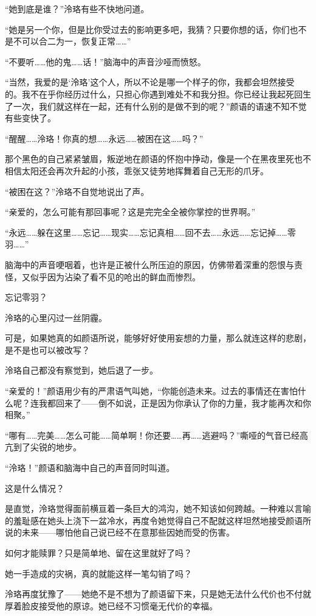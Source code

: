 \documentclass[UTF8, scheme = chinese, openany]{ctexbook}
\begin{document}
“她到底是谁？”泠珞有些不快地问道。

“她是另一个你，但是比你受过去的影响更多吧，我猜？只要你想的话，你们也不是不可以合二为一，恢复正常……”

“不要听……他的鬼……话！”脑海中的声音沙哑而愤怒。

“当然，我爱的是‘泠珞’这个人，所以不论是哪一个样子的你，我都会坦然接受的。我不在乎你经历过什么，只担心你遇到难处不和我分担。你已经让我起死回生了一次，我们就这样在一起，还有什么别的是做不到的呢？”颜语的语速不知不觉有些变快了。

“醒醒……泠珞！你真的想……永远……被困在这……吗？”

那个黑色的自己紧紧皱眉，叛逆地在颜语的怀抱中挣动，像是一个在黑夜里死也不相信太阳还会再次升起的小孩，乖张又徒劳地挥舞着自己无形的爪牙。

“被困在这？”泠珞不自觉地说出了声。

“亲爱的，怎么可能有那回事呢？这是完完全全被你掌控的世界啊。”

“永远……躲在这里……忘记……现实……忘记真相……回不去……永远……忘记掉……零羽……”

脑海中的声音哽咽着，也许是正被什么所压迫的原因，仿佛带着深重的怨恨与责怪，又似乎因为沾染了看不见的呛出的鲜血而惨烈。

忘记零羽？

泠珞的心里闪过一丝阴霾。

可是，如果她真的如颜语所说，能够好好使用妄想的力量，那么就连这样的悲剧，是不是也可以被改写？

泠珞自己都没有察觉到，她后退了一步。

“亲爱的！”颜语用少有的严肃语气叫她，“你能创造未来。过去的事情还在害怕什么呢？连我都回来了——倒不如说，正是因为你承认了你的力量，我才能再次和你相聚。”

“哪有……完美……怎么可能……简单啊！你还要……再……逃避吗？”嘶哑的气音已经高亢到了尖锐的地步。

“泠珞！”颜语和脑海中自己的声音同时叫道。

这是什么情况？

是直觉，泠珞觉得面前横亘着一条巨大的鸿沟，她不知该如何跨越。一种难以言喻的羞耻感在她头上浇下一盆冷水，再度令她觉得自己不配就这样坦然地接受颜语所说的未来——哪怕他自己说已经不在意那些因她而受的伤害。

如何才能赎罪？只是简单地、留在这里就好了吗？

她一手造成的灾祸，真的就能这样一笔勾销了吗？

泠珞再度犹豫了——她绝不是不想为了颜语留下来，只是她无法什么代价也不付就厚着脸皮接受他的原谅。她已经不习惯毫无代价的幸福。
\end{document}
